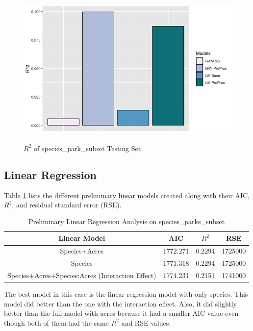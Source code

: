 \documentclass[stu, floatsintext, 11pt]{apa7}
\begin{document}
\begin{figure}[h!]
\centering
\caption{$R^2$ of species\_park\_subset Testing Set}
\includegraphics[scale=0.6]{images/test_R2_subset.png}
\label{fig:test_R2_sub}
\end{figure}

\subsection{Linear Regression}
Table \ref{tab:lm} lists the different preliminary linear models created along with their AIC, $R^2$, and residual standard error (RSE).
\begin{table}[h!]
    \centering
    \caption{Preliminary Linear Regression Analysis on species\_parks\_subset}
    \begin{tabular}{c c c c}
    \hline
    \textbf{Linear Model} & \textbf{AIC} & \textbf{$R^2$} & \textbf{RSE} \\
    \hline
    Species+Acres &  1772.271 &  0.2294 & 1725000 \\
    Species & 1771.318 & 0.2294 & 1725000 \\
    Species+Acres+Species:Acres (Interaction Effect) & 1774.231 & 0.2151 & 1741000 \\
    \hline
    \end{tabular}
    \label{tab:lm}
\end{table}

The best model in this case is the linear regression model with only species. This model did better than the one with the interaction effect. Also, it did slightly better than the full model with acres because it had a smaller AIC value even though both of them had the same $R^2$ and RSE values.
\end{document}
